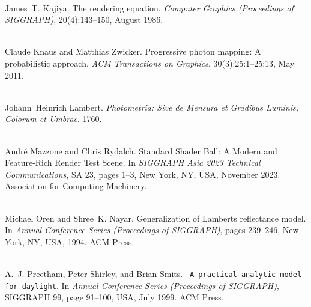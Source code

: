 \begin{DoxyDescription}
\item[\label{citelist_CITEREF_Kajiya:1986:Rendering}%
\Hypertarget{citelist_CITEREF_Kajiya:1986:Rendering}%
\mbox{[}7\mbox{]}]\hfill \\
James~T. Kajiya. The rendering equation. {\itshape Computer Graphics (Proceedings of SIGGRAPH)}, 20(4)\+:143--150, August 1986. 


\item[\label{citelist_CITEREF_Knaus:2011:Progressive}%
\Hypertarget{citelist_CITEREF_Knaus:2011:Progressive}%
\mbox{[}8\mbox{]}]\hfill \\
Claude Knaus and Matthias Zwicker. Progressive photon mapping\+: A probabilistic approach. {\itshape ACM Transactions on Graphics}, 30(3)\+:25\+:1--25\+:13, May 2011. 


\item[\label{citelist_CITEREF_Lambert:1760:Photometria}%
\Hypertarget{citelist_CITEREF_Lambert:1760:Photometria}%
\mbox{[}9\mbox{]}]\hfill \\
Johann~Heinrich Lambert. {\itshape Photometria\+: Sive de Mensura et Gradibus Luminis, Colorum et Umbrae}. 1760.


\item[\label{citelist_CITEREF_Mazzone:2023:Standard}%
\Hypertarget{citelist_CITEREF_Mazzone:2023:Standard}%
\mbox{[}10\mbox{]}]\hfill \\
Andr\'{e} Mazzone and Chris Rydalch. Standard Shader Ball\+: A Modern and Feature-\/\+Rich Render Test Scene. In {\itshape SIGGRAPH Asia 2023 Technical Communications}, SA \textquotesingle{}23, pages 1--3, New York, NY, USA, November 2023. Association for Computing Machinery. 


\item[\label{citelist_CITEREF_Oren:1994:Generalization}%
\Hypertarget{citelist_CITEREF_Oren:1994:Generalization}%
\mbox{[}11\mbox{]}]\hfill \\
Michael Oren and Shree~K. Nayar. Generalization of Lambert\textquotesingle{}s reflectance model. In {\itshape Annual Conference Series (Proceedings of SIGGRAPH)}, pages 239--246, New York, NY, USA, 1994. ACM Press. 


\item[\label{citelist_CITEREF_Preetham:1999:Practical}%
\Hypertarget{citelist_CITEREF_Preetham:1999:Practical}%
\mbox{[}12\mbox{]}]\hfill \\
A.~J. Preetham, Peter Shirley, and Brian Smits. \href{https://doi.org/10.1145/311535.311545}{\texttt{ A practical analytic model for daylight}}. In {\itshape Annual Conference Series (Proceedings of SIGGRAPH)}, SIGGRAPH \textquotesingle{}99, page 91–100, USA, July 1999. ACM Press. 



\end{DoxyDescription}

